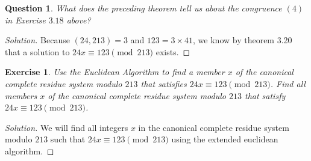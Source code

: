 \documentclass[12pt,leqno]{article}
\numberwithin{equation}{section}
\newtheorem{exer}[thm]{Exercise}
\newtheorem{ques}[thm]{Question}
\theoremstyle{definition}
\begin{document}
\begin{ques}
What does the preceding theorem tell us about the congruence $(4)$
in Exercise $3.18$ above?
\end{ques}

\begin{proof}[Solution]
Because $(24, 213) = 3$ and $123 = 3 \times 41$, we know by theorem 3.20 that a solution to $24x \equiv 123 \pmod{213}$ exists.
\end{proof}


\begin{exer}
Use the Euclidean Algorithm to find a
member $x$ of the canonical complete residue system modulo $213$
that satisfies $24x \equiv 123 \pmod{213}$. Find all members $x$ of
the canonical complete residue system modulo $213$ that satisfy $24x
\equiv 123 \pmod{213}$.
\end{exer}

\begin{proof}[Solution]
We will find all integers $x$ in the canonical complete residue system modulo $213$ such that $24x \equiv 123 \pmod{213}$ using the extended euclidean algorithm.
\end{proof}
\end{document}
